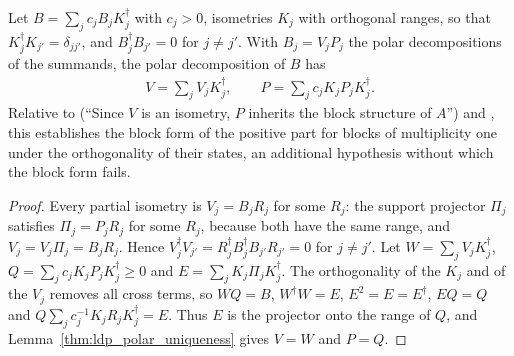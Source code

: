 \begin{lemma}
    \label{lem:ldp_orthogonal_sum_polar}
    \leanok
    Let $B=\sum_jc_jB_jK_j^\dagger$ with $c_j>0$, isometries $K_j$ with
    orthogonal ranges, so that $K_j^\dagger K_{j'}=\delta_{jj'}$, and
    $B_j^\dagger B_{j'}=0$ for $j\neq j'$. With $B_j=V_jP_j$ the polar
    decompositions of the summands, the polar decomposition of $B$ has
    \begin{align*}
        V=\sum_jV_jK_j^\dagger,\qquad P=\sum_jc_jK_jP_jK_j^\dagger.
    \end{align*}
    Relative to \cite[eq.~(S5)]{Malz2024Preparation} (``Since $V$ is an isometry, $P$
    inherits the block structure of $A$'') and
    \cite{gap:mswc24_block_form_mixed_overlap}, this establishes the block form
    of the positive part for blocks of multiplicity one under the orthogonality
    of their states, an additional hypothesis without which the block form
    fails.
\end{lemma}
\begin{proof}
    \leanok
    Every partial isometry is $V_j=B_jR_j$ for some $R_j$: the support
    projector $\Pi_j$ satisfies $\Pi_j=P_jR_j$ for some $R_j$, because both
    have the same range, and $V_j=V_j\Pi_j=B_jR_j$. Hence
    $V_j^\dagger V_{j'}=R_j^\dagger B_j^\dagger B_{j'}R_{j'}=0$ for $j\neq j'$. Let
    $W=\sum_jV_jK_j^\dagger$, $Q=\sum_jc_jK_jP_jK_j^\dagger\geq0$ and
    $E=\sum_jK_j\Pi_jK_j^\dagger$. The orthogonality of the $K_j$ and of the
    $V_j$ removes all cross terms, so $WQ=B$, $W^\dagger W=E$, $E^2=E=E^\dagger$,
    $EQ=Q$ and $Q\sum_jc_j^{-1}K_jR_jK_j^\dagger=E$. Thus $E$ is the projector
    onto the range of $Q$, and Lemma~\ref{thm:ldp_polar_uniqueness} gives
    $V=W$ and $P=Q$.
\end{proof}

